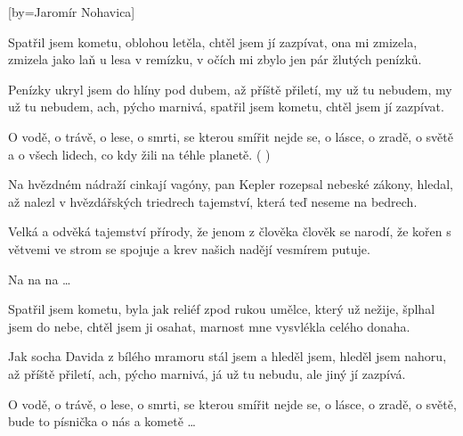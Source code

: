 [by={Jaromír Nohavica}]

\beginverse{}
Spatřil jsem kometu, oblohou letěla,
chtěl jsem jí zazpívat, ona mi zmizela,
zmizela jako laň u lesa v remízku,
v očích mi zbylo jen pár žlutých penízků.
\endverse{}

\beginverse{}
Penízky ukryl jsem do hlíny pod dubem,
až příště přiletí, my už tu nebudem,
my už tu nebudem, ach, pýcho marnivá,
spatřil jsem kometu, chtěl jsem jí zazpívat.
\endverse{}

\beginchorus{}
O vodě, o trávě, o lese,
o smrti, se kterou smířit nejde se, 
o lásce, o zradě, o světě
a o všech lidech, co kdy žili na téhle planetě.
(   )
\endchorus{}

\beginverse{}
Na hvězdném nádraží cinkají vagóny,
pan Kepler rozepsal nebeské zákony,
hledal, až nalezl v hvězdářských triedrech
tajemství, která teď neseme na bedrech.
\endverse{}

\beginverse{}
Velká a odvěká tajemství přírody,
že jenom z člověka člověk se narodí,
že kořen s větvemi ve strom se spojuje
a krev našich nadějí vesmírem putuje.
\endverse{}

\beginchorus{}
Na na na \ldots{}
\endchorus{}

\beginverse{}
Spatřil jsem kometu, byla jak reliéf
zpod rukou umělce, který už nežije,
šplhal jsem do nebe, chtěl jsem ji osahat,
marnost mne vysvlékla celého donaha.
\endverse{}

\beginverse{}
Jak socha Davida z bílého mramoru
stál jsem a hleděl jsem, hleděl jsem nahoru,
až příště přiletí, ach, pýcho marnivá,
já už tu nebudu, ale jiný jí zazpívá.
\endverse{}

\beginchorus{}
O vodě, o trávě, o lese,
o smrti, se kterou smířit nejde se,
o lásce, o zradě, o světě,
bude to písnička o nás a kometě \ldots{}
\endchorus{}

\endsong{}
